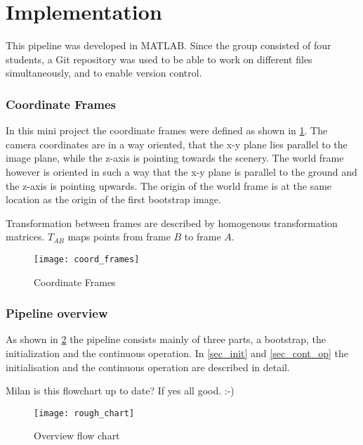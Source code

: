 \section{Implementation}

This pipeline was developed in MATLAB. Since the group consisted of four students, a Git repository was used to be able to work on different files simultaneously, and to enable version control.

\subsubsection{Coordinate Frames}
In this mini project the coordinate frames were defined as shown in \cref{img_coord_frames}. The camera coordinates are in a way oriented, that the x-y plane lies parallel to the image plane, while the z-axis is pointing towards the scenery. The world frame however is oriented in such a way that the x-y plane is parallel to the ground and the z-axis is pointing upwards. The origin of the world frame is at the same location as the origin of the first bootstrap image.

Transformation between frames are described by homogenous transformation matrices. $T_{AB}$ maps points from frame $B$ to frame $A$.

\begin{figure}[ht]
	\centering
	\texttt{[image: coord\_frames]}
	\caption{Coordinate Frames}
	\label{img_coord_frames}
\end{figure}

\subsubsection{Pipeline overview}

As shown in \cref{img_flow_rough} the pipeline consists mainly of three parts, a bootstrap, the initialization and the continuous operation. In \cref{sec_init} and \cref{sec_cont_op} the initialisation and the continuous operation are described in detail.

Milan is this flowchart up to date? If yes all good. :-)

\begin{figure}[ht]
	\centering
	\texttt{[image: rough\_chart]}
	\caption{Overview flow chart}
	\label{img_flow_rough}
\end{figure}

%

